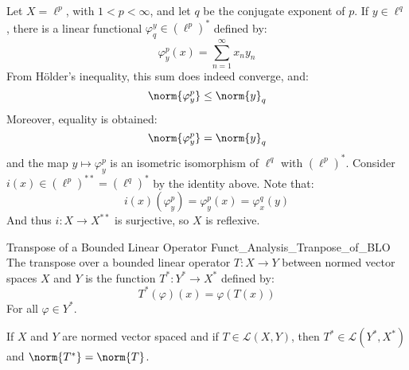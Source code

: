 \documentclass[crop=false,class=book,oneside]{standalone}                      %
\begin{document}
        \begin{lexample}
            Let $X=\ell^{p}$, with $1<p<\infty$, and let
            $q$ be the conjugate exponent of $p$. If $y\in\ell^{q}$,
            there is a linear functional
            $\varphi_{q}^{y}\in(\ell^{p})^{*}$ defined by:
            \begin{equation}
                \varphi_{y}^{p}(x)=\sum_{n=1}^{\infty}x_{n}y_{n}
            \end{equation}
            From H\"{o}lder's inequality, this sum does indeed
            converge, and:
            \begin{equation}
                \norm{\varphi_{y}^{p}}\leq\norm{y}_{q}
            \end{equation}
            Moreover, equality is obtained:
            \begin{equation}
                \norm{\varphi_{y}^{p}}=\norm{y}_{q}
            \end{equation}
            and the map $y\mapsto\varphi_{y}^{p}$ is an
            isometric isomorphism of $\ell^{q}$ with
            $(\ell^{p})^{*}$. Consider
            $i(x)\in(\ell^{p})^{**}=(\ell^{q})^{*}$ by
            the identity above. Note that:
            \begin{equation}
                i(x)(\varphi_{y}^{p})=\varphi_{y}^{p}(x)
                =\varphi_{x}^{q}(y)
            \end{equation}
            And thus $i:X\rightarrow{X}^{**}$ is surjective, so
            $X$ is reflexive.
        \end{lexample}
        \begin{ldefinition}{Transpose of a Bounded Linear Operator}
              {Funct_Analysis_Tranpose_of_BLO}
            The transpose over a bounded linear operator
            $T:X\rightarrow{Y}$ between normed vector spaces $X$
            and $Y$ is the function $T^{*}:Y^{*}\rightarrow{X}^{*}$
            defined by:
            \begin{equation}
                T^{*}(\varphi)(x)=\varphi(T(x))
            \end{equation}
            For all $\varphi\in{Y}^{*}$.
        \end{ldefinition}
        \begin{theorem}
            If $X$ and $Y$ are normed vector spaced and if
            $T\in\mathcal{L}(X,Y)$, then
            $T^{*}\in\mathcal{L}(Y^{*},X^{*})$ and
            $\norm{T^{*}}=\norm{T}$.
        \end{theorem}
\end{document}
